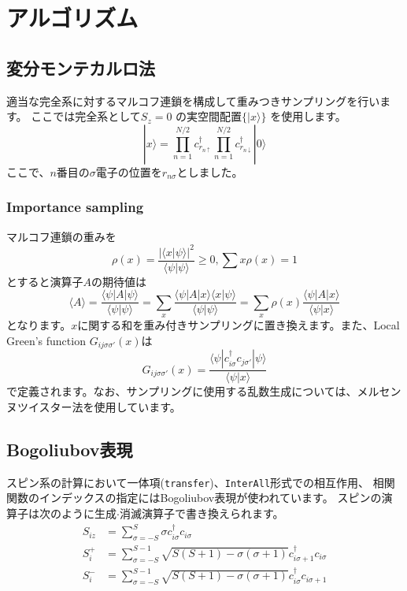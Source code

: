 \chapter{アルゴリズム}
\label{Ch:algorithm}
\section{変分モンテカルロ法}
適当な完全系に対するマルコフ連鎖を構成して重みつきサンプリングを行います。
ここでは完全系として$S_z = 0$ の実空間配置$\{| x\rangle\}$ を使用します。
\begin{equation}
| x\rangle =  \prod_{n=1}^{N/2} c_{r_{n\uparrow}}^{\dag} \prod_{n=1}^{N/2} c_{r_{n\downarrow}}^{\dag} |0 \rangle
\end{equation}
ここで、$n$番目の$\sigma$電子の位置を$r_{n\sigma}$としました。
\subsection{Importance sampling}
マルコフ連鎖の重みを
\begin{equation}
\rho(x)=\frac{|\langle x| \psi \rangle|^2}{\langle \psi | \psi \rangle} \ge 0, \sum{x} \rho(x)=1
\end{equation}
とすると演算子$A$の期待値は
\begin{equation}
\langle A \rangle =\frac{\langle \psi| A| \psi \rangle}{\langle \psi | \psi \rangle} 
=\sum_x \frac{\langle \psi| A | x\rangle \langle x| \psi \rangle}{\langle \psi |\psi \rangle} 
=\sum_x \rho(x) \frac{\langle \psi| A | x\rangle }{\langle \psi |x \rangle} 
\end{equation}
となります。$x$に関する和を重み付きサンプリングに置き換えます。また、Local Green's function $G_{ij\sigma\sigma'}(x)$は
\begin{equation}
G_{ij\sigma\sigma'}(x)=\frac{\langle \psi | c_{i\sigma}^{\dag} c_{j\sigma'} | \psi \rangle}{\langle \psi | x \rangle}
\end{equation}
で定義されます。なお、サンプリングに使用する乱数生成については、メルセンヌツイスター法を使用しています\cite{Mutsuo2008}。

\section{Bogoliubov表現}\label{sec_bogoliubov_rep}

スピン系の計算において一体項(\verb|transfer|)、\verb|InterAll|形式での相互作用、
相関関数のインデックスの指定にはBogoliubov表現が使われています。
スピンの演算子は次のように生成$\cdot$消滅演算子で書き換えられます。
\begin{align}
  S_{i z} &= \sum_{\sigma = -S}^{S} \sigma c_{i \sigma}^\dagger c_{i \sigma}
  \\
  S_{i}^+ &= \sum_{\sigma = -S}^{S-1} 
  \sqrt{S(S+1) - \sigma(\sigma+1)} 
  c_{i \sigma+1}^\dagger c_{i \sigma}
  \\
  S_{i}^- &= \sum_{\sigma = -S}^{S-1} 
  \sqrt{S(S+1) - \sigma(\sigma+1)} 
  c_{i \sigma}^\dagger c_{i \sigma+1}
\end{align}

